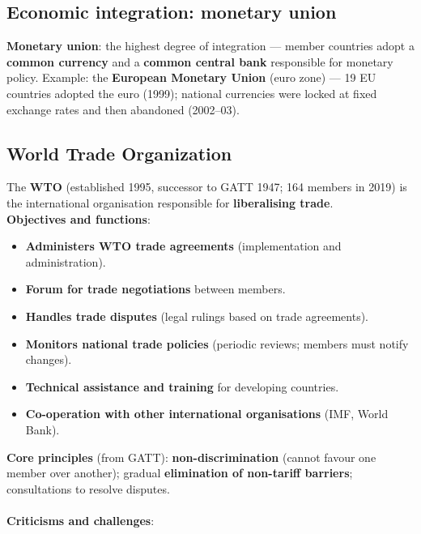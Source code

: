 \documentclass[a4paper,12pt]{article}
\begin{document}
\subsection{Economic integration: monetary union}
\textbf{Monetary union}: the highest degree of integration --- member countries adopt a \textbf{common currency} and a \textbf{common central bank} responsible for monetary policy. Example: the \textbf{European Monetary Union} (euro zone) --- 19 EU countries adopted the euro (1999); national currencies were locked at fixed exchange rates and then abandoned (2002--03).
\subsection{World Trade Organization}
The \textbf{WTO} (established 1995, successor to GATT 1947; 164 members in 2019) is the international organisation responsible for \textbf{liberalising trade}.
\\\textbf{Objectives and functions}:
\begin{itemize}
  \item \textbf{Administers WTO trade agreements} (implementation and administration).
  \item \textbf{Forum for trade negotiations} between members.
  \item \textbf{Handles trade disputes} (legal rulings based on trade agreements).
  \item \textbf{Monitors national trade policies} (periodic reviews; members must notify changes).
  \item \textbf{Technical assistance and training} for developing countries.
  \item \textbf{Co-operation with other international organisations} (IMF, World Bank).
\end{itemize}
\textbf{Core principles} (from GATT): \textbf{non-discrimination} (cannot favour one member over another); gradual \textbf{elimination of non-tariff barriers}; consultations to resolve disputes.
\\\\
\textbf{Criticisms and challenges}:
\end{document}
